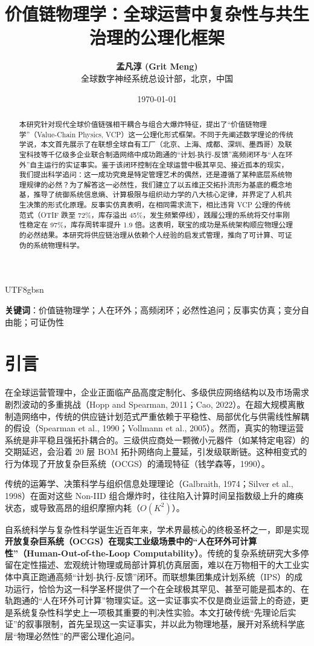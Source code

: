\documentclass[11pt,a4paper]{article}
\title{\textbf{价值链物理学：全球运营中复杂性与共生治理的公理化框架}}
\author{\textbf{孟凡淳 (Grit Meng)} \\ 全球数字神经系统总设计部，北京，中国}
\date{\today}
\begin{document}
\begin{CJK*}{UTF8}{gbsn}

\maketitle

\begin{abstract}
本研究针对现代全球价值链强相干耦合与组合大爆炸特征，提出了“价值链物理学”（Value-Chain Physics, VCP）这一公理化形式框架。不同于先阐述数学理论的传统学说，本文首先展示了在联想全球自有工厂（北京、上海、成都、深圳、墨西哥）及联宝科技等千亿级多企业联合制造网络中成功跑通的“计划-执行-反馈”高频闭环与“人在环外”自主运行的实证事实。鉴于该闭环控制在全球运营中极其罕见、接近孤本的现实，我们提出科学追问：这一成功究竟是特定管理艺术的偶然，还是遵循了某种底层系统物理规律的必然？为了解答这一必然性，我们建立了以五维正交拓扑流形为基底的概念地基，推导了统御系统信息熵、计算极限与组织动力学的八大核心定律，并界定了人机共生决策的形式化原理。反事实仿真表明，在相同需求流下，相比违背 VCP 公理的传统范式（OTIF 跌至 72\%，库存溢出 45\%，发生频繁停线），践履公理的系统将交付率刚性稳定在 97\%，库存周转率提升 1.9 倍。这表明，联宝的成功是系统架构顺应物理公理的必然结果。本研究将供应链治理从依赖个人经验的启发式管理，推向了可计算、可证伪的系统物理科学。
\end{abstract}

\textbf{关键词}：价值链物理学；人在环外；高频闭环；必然性追问；反事实仿真；变分自由能；可证伪性

\newpage

\section{引言}
在全球运营管理中，企业正面临产品高度定制化、多级供应网络结构以及市场需求剧烈波动的多重挑战（Hopp and Spearman, 2011；Cao, 2022）。在超大规模离散制造网络中，传统的供应链计划范式严重依赖于平稳性、局部优化与供需线性解耦的假设（Spearman et al., 1990；Vollmann et al., 2005）。然而，真实的物理运营系统是非平稳且强拓扑耦合的。三级供应商处一颗微小元器件（如某特定电容）的交期延迟，会沿着 20 层 BOM 拓扑网络向上蔓延，引发级联断链。这种相变式的行为体现了开放复杂巨系统（OCGS）的涌现特征（钱学森等，1990）。

传统的运筹学、决策科学与组织信息处理理论（Galbraith, 1974；Silver et al., 1998）在面对这些 Non-IID 组合爆炸时，往往陷入计算时间呈指数级上升的瘫痪状态，或导致高昂的组织摩擦内耗（$O(K^2)$）。

自系统科学与复杂性科学诞生近百年来，学术界最核心的终极圣杯之一，即是实现\textbf{开放复杂巨系统（OCGS）在现实工业级场景中的“人在环外可计算性”（Human-Out-of-the-Loop Computability）}。传统的复杂系统研究大多停留在定性描述、宏观统计物理或局部计算机仿真层面，难以在万物相干的大工业实体中真正跑通高频“计划-执行-反馈”闭环。而联想集团集成计划系统（IPS）的成功运行，恰恰为这一科学圣杯提供了一个在全球极其罕见、甚至可能是孤本的、在轨跑通的“人在环外可计算”物理实证。这一实证事实不仅是商业运营上的奇迹，更是系统复杂性科学史上一项极其重要的判决性实验。本文打破传统“先理论后实证”的叙事限制，首先呈现这一实证事实，并以此为物理地基，展开对系统科学底层“物理必然性”的严密公理化追问。


\end{CJK*}
\end{document}
